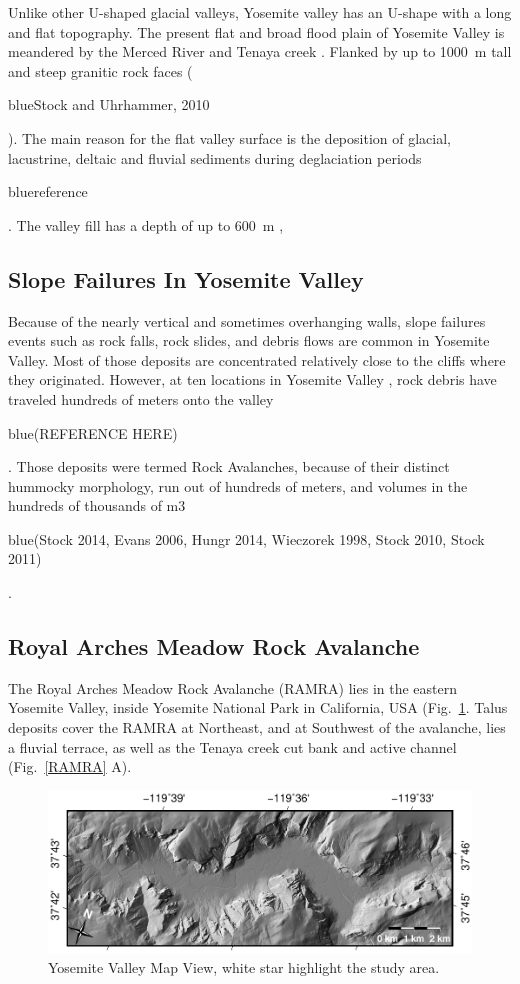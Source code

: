 \documentclass[utf8]{frontiersSCNS}
\newcommand{\COMON}{\begin{color}{blue}}
\newcommand{\COMOFF}{\end{color}}
\begin{document}
Unlike other U-shaped glacial valleys, Yosemite valley has an U-shape with a long and flat topography. The present flat and broad flood plain of Yosemite Valley is meandered by the Merced River and Tenaya creek \cite{Wieczorek+1996}. Flanked by up to \SI{1000}{m} tall and steep granitic rock faces (\COMON Stock and Uhrhammer, 2010 \COMOFF). The main reason for the flat valley surface is the deposition of glacial, lacustrine, deltaic and fluvial sediments during deglaciation periods \COMON reference \COMOFF. The valley fill has a depth of up to \SI{600}{m} \cite{gutenberg1956seismic},


    
\subsection{Slope Failures In Yosemite Valley}

Because of  the nearly vertical and sometimes overhanging walls, slope failures events such as rock falls, rock slides, and debris flows are common in Yosemite Valley. Most of those deposits are concentrated relatively close to the cliffs where they originated. However, at ten locations in Yosemite Valley , rock debris have traveled hundreds of meters onto the valley \COMON(REFERENCE HERE)\COMOFF. Those deposits were termed Rock Avalanches, because of their distinct hummocky morphology, run out of hundreds of meters, and volumes in the hundreds of thousands of m3 \COMON(Stock 2014, Evans 2006,  Hungr 2014, Wieczorek 1998, Stock 2010, Stock 2011)\COMOFF. 


\subsection{Royal Arches Meadow Rock Avalanche}\label{sec:introRAMRA}

The Royal Arches Meadow Rock Avalanche (RAMRA) lies in the eastern Yosemite Valley, inside Yosemite National Park in California, USA (Fig.~\ref{Study_Area}. Talus deposits cover the RAMRA at Northeast, and at Southwest of the avalanche, lies a fluvial terrace, as well as the Tenaya creek cut bank and active channel (Fig.~\ref{RAMRA} A). 


\begin{figure}[h]
  
  \includegraphics[width=\textwidth]{Yosemite.pdf}
  \caption{Yosemite Valley Map View, white star highlight the study area.  \label{Study_Area}}
        
\end{figure}
\end{document}
